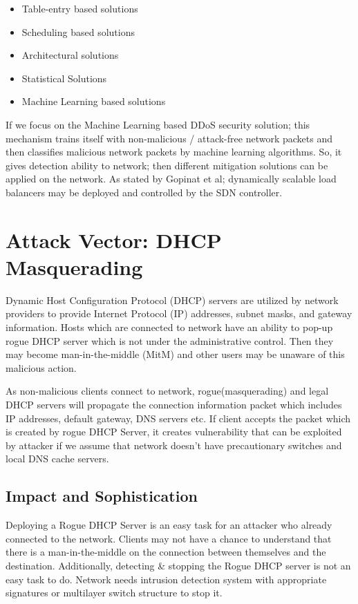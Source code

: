\documentclass[conference,compsoc]{IEEEtran}
\begin{document}
\begin{itemize}
\item Table-entry based solutions
\item Scheduling based solutions
\item Architectural solutions
\item Statistical Solutions
\item Machine Learning based solutions
\end{itemize}

If we focus on the Machine Learning based DDoS security solution; this mechanism trains itself with non-malicious / attack-free network packets and then classifies malicious network packets by machine learning algorithms. So, it gives detection ability to network; then different mitigation solutions can be applied on the network. As stated by Gopinat et al; dynamically scalable load balancers may be deployed and controlled by the SDN controller. \cite{DDosMitigation}

\section{Attack Vector: DHCP Masquerading}

Dynamic Host Configuration Protocol (DHCP) servers are utilized by network providers to provide Internet Protocol (IP) addresses, subnet masks, and gateway information. Hosts which are connected to network have an ability to pop-up rogue DHCP server which is not under the administrative control. Then they may become man-in-the-middle (MitM) and other users may be unaware of this malicious action. 

As non-malicious clients connect to network, rogue(masquerading) and legal DHCP servers will propagate the connection information packet which includes IP addresses, default gateway, DNS servers etc. If client accepts the packet which is created by rogue DHCP Server, it creates vulnerability that can be exploited by attacker if we assume that network doesn’t
have precautionary switches and local DNS cache servers.


\subsection{Impact and Sophistication}

Deploying a Rogue DHCP Server is an easy task for an attacker who already connected to the network. Clients may not have a chance to understand that there is a man-in-the-middle on the connection between themselves and the destination. Additionally, detecting \& stopping the Rogue DHCP server is not an easy task to do. Network needs intrusion detection system with appropriate signatures or multilayer switch structure to stop it. 
\end{document}
